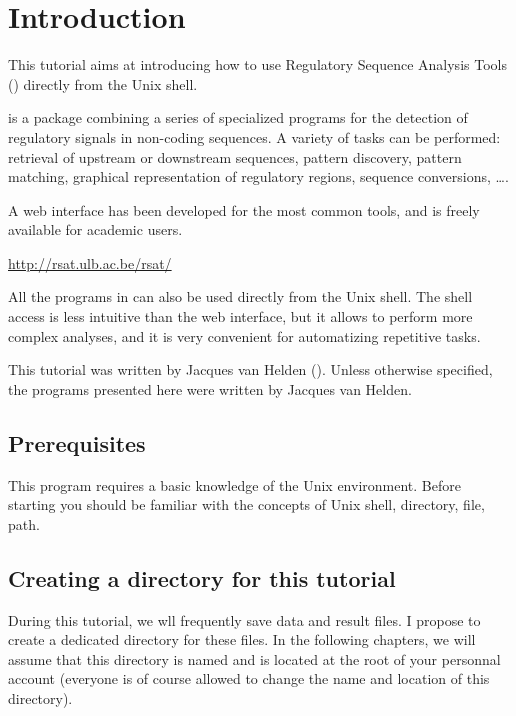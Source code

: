 
\chapter{Introduction}

This tutorial aims at introducing how to use Regulatory Sequence
Analysis Tools (\RSAT) directly from the Unix shell.

\RSAT is a package combining a series of specialized programs for the
detection of regulatory signals in non-coding sequences. A variety of
tasks can be performed: retrieval of upstream or downstream sequences,
pattern discovery, pattern matching, graphical representation of
regulatory regions, sequence conversions, \ldots.

A web interface has been developed for the most common tools, and is
freely available for academic users.

\url{http://rsat.ulb.ac.be/rsat/}

All the programs in \RSAT can also be used directly from the Unix
shell. The shell access is less intuitive than the web interface, but
it allows to perform more complex analyses, and it is very convenient
for automatizing repetitive tasks.

This tutorial was written by Jacques van Helden
().  Unless otherwise specified,
the programs presented here were written by Jacques van Helden.

\section{Prerequisites}

This program requires a basic knowledge of the Unix
environment. Before starting you should be familiar with the concepts
of Unix shell, directory, file, path.

\section{Creating a directory for this tutorial}

During this tutorial, we wll frequently save data and result files. I
propose to create a dedicated directory for these files. In the
following chapters, we will assume that this directory is named
 and is located at the root of your personnal
account (everyone is of course allowed to change the name and location
of this directory).

